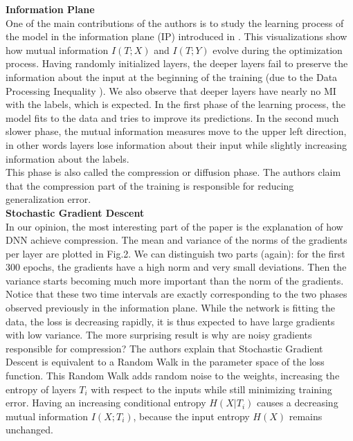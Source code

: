 \documentclass[twocolumn,superscriptaddress,aps]{revtex4-1}
\begin{document}
\noindent \textbf{Information Plane} \\[0.15cm]
\indent One of the main contributions of the authors is to study the learning process of the model in the information plane (IP) introduced in \citep{Tishby2}. This visualizations show how mutual information $I(T;X)$ and $I(T;Y)$ evolve during the optimization process. Having randomly initialized layers, the deeper layers fail to preserve the information about the input at the beginning of the training (due to the Data Processing Inequality \citep{dpi}). We also observe that deeper layers have nearly no MI with the labels, which is expected. In the first phase of the learning process, the model fits to the data and tries to improve its predictions. In the second much slower phase, the mutual information measures move to the upper left direction, in other words layers lose information about their input while slightly increasing information about the labels.\\This phase is also called the compression or diffusion phase. The authors claim that the compression part of the training is responsible for reducing generalization error.\\

\noindent \textbf{Stochastic Gradient Descent} \\[0.15cm]
\indent In our opinion, the most interesting part of the paper is the explanation of how DNN achieve compression. The mean and variance of the norms of the gradients per layer are plotted in Fig.2. We can distinguish two parts (again): for the first 300 epochs, the gradients have a high norm and very small deviations. Then the variance starts becoming much more important than the norm of the gradients. Notice that these two time intervals are exactly corresponding to the two phases observed previously in the information plane. While the network is fitting the data, the loss is decreasing rapidly, it is thus expected to have large gradients with low variance. The more surprising result is why are noisy gradients responsible for compression? The authors explain that Stochastic Gradient Descent is equivalent to a Random Walk in the parameter space of the loss function. This Random Walk adds random noise to the weights, increasing the entropy of layers $T_i$ with respect to the inputs while still minimizing training error.  Having an increasing conditional entropy $H(X|T_i)$ causes a decreasing mutual information $I(X;T_i)$, because the input entropy $H(X)$ remains unchanged.\\
\end{document}
